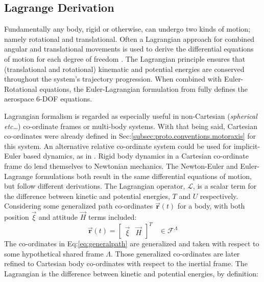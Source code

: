 \subsection{Lagrange Derivation}
\label{subsec:dynamics.rigidbody.lagrange}
Fundamentally any body, rigid or otherwise, can undergo two kinds of motion; namely rotational and translational. Often a Lagrangian approach for combined angular and translational movements is used to derive the differential equations of motion for each degree of freedom \cite{classicaldynamics,rotationrigidbody}. The Lagrangian principle ensures that (translational and rotational) kinematic and potential energies are conserved throughout the system's trajectory progression. When combined with Euler-Rotational equations, the Euler-Lagrangian formulation from \cite{lagrange-formalism} fully defines the aerospace 6-DOF equations.
\par
Lagrangian formalism is regarded as especially useful in non-Cartesian (\emph{spherical etc\ldots}) co-ordinate frames or multi-body systems. With that being said, Cartesian co-ordinates were already defined in Sec:\ref{subsec:proto.conventions.motoraxis} for this system. An alternative relative co-ordinate system could be used for implicit-Euler based dynamics, as in \cite{autonomousrobotseuler}.
Rigid body dynamics in a Cartesian co-ordinate frame do lend themselves to Newtonian mechanics. The Newton-Euler and Euler-Lagrange formulations both result in the same differential equations of motion, but follow different derivations. The Lagrangian operator, $\mathcal{L}$, is a scalar term for the difference between kinetic and potential energies, $T$ and $U$ respectively. Considering some generalized path co-ordinates $\vec{\mathbf{r}}(t)$ for a body, with both position $\vec{\xi}$ and attitude $\vec{H}$ terms included:
\begin{equation}\label{eq:generalpath}
\vec{\mathbf{r}}(t)=\begin{bmatrix}
\vec{\xi} & \vec{H}
\end{bmatrix}^T~~~~\in\mathcal{F}^{\Lambda}
\end{equation}
The co-ordinates in Eq:\ref{eq:generalpath} are generalized and taken with respect to some hypothetical shared frame $\Lambda$. Those generalized co-ordinates are later refined to Cartesian body co-ordinates with respect to the inertial frame. The Lagrangian is the difference between kinetic and potential energies, by definition:
